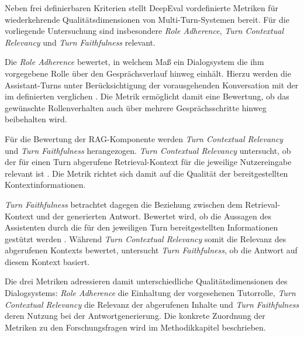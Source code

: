 Neben frei definierbaren Kriterien stellt DeepEval vordefinierte Metriken für wiederkehrende Qualitätsdimensionen von Multi-Turn-Systemen bereit. Für die vorliegende Untersuchung sind insbesondere \textit{Role Adherence}, \textit{Turn Contextual Relevancy} und \textit{Turn Faithfulness} relevant.
 
Die \textit{Role Adherence} bewertet, in welchem Maß ein Dialogsystem die ihm vorgegebene Rolle über den Gesprächsverlauf hinweg einhält. Hierzu werden die Assistant-Turns unter Berücksichtigung der vorausgehenden Konversation mit der im \texttt{} definierten \texttt{} verglichen \cite{DeepEvalRoleAdherence}. Die Metrik ermöglicht damit eine Bewertung, ob das gewünschte Rollenverhalten auch über mehrere Gesprächsschritte hinweg beibehalten wird.

Für die Bewertung der RAG-Komponente werden \textit{Turn Contextual Relevancy} und \textit{Turn Faithfulness} herangezogen. \textit{Turn Contextual Relevancy} untersucht, ob der für einen Turn abgerufene Retrieval-Kontext für die jeweilige Nutzereingabe relevant ist \cite{DeepEvalTurnContextualRelevancy}. Die Metrik richtet sich damit auf die Qualität der bereitgestellten Kontextinformationen.
 
\textit{Turn Faithfulness} betrachtet dagegen die Beziehung zwischen dem Retrieval-Kontext und der generierten Antwort. Bewertet wird, ob die Aussagen des Assistenten durch die für den jeweiligen Turn bereitgestellten Informationen gestützt werden \cite{DeepEvalTurnFaithfulness}. Während \textit{Turn Contextual Relevancy} somit die Relevanz des abgerufenen Kontexts bewertet, untersucht \textit{Turn Faithfulness}, ob die Antwort auf diesem Kontext basiert.
 
Die drei Metriken adressieren damit unterschiedliche Qualitätsdimensionen des Dialogsystems: \textit{Role Adherence} die Einhaltung der vorgesehenen Tutorrolle, \textit{Turn Contextual Relevancy} die Relevanz der abgerufenen Inhalte und \textit{Turn Faithfulness} deren Nutzung bei der Antwortgenerierung. Die konkrete Zuordnung der Metriken zu den Forschungsfragen wird im Methodikkapitel beschrieben.
 